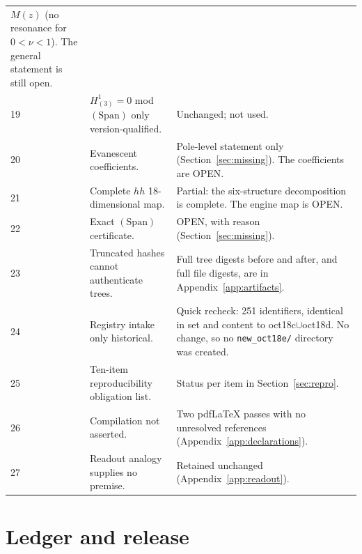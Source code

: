 \documentclass[11pt,a4paper]{article}
\newcommand{\Span}{(\mathrm{Span})}
\newcommand{\loc}[1]{\nolinkurl{#1}}
\newcommand{\OPEN}{\textsf{OPEN}}
\theoremstyle{plain}
\theoremstyle{definition}
\theoremstyle{remark}
\numberwithin{equation}{section}
\begin{document}
\begin{longtable}{@{}L{.035\linewidth}L{.36\linewidth}L{.54\linewidth}@{}}
\(M(z)\) (no resonance for \(0<\nu<1\)).
The general statement is still open.\\
19 & \(H^1_{(3)}=0\) mod \(\Span\) only version-qualified. &
Unchanged; not used.\\
20 & Evanescent coefficients. &
Pole-level statement only (Section~\ref{sec:missing}).
The coefficients are \OPEN.\\
21 & Complete \(hh\) 18-dimensional map. &
Partial: the six-structure decomposition is complete.
The engine map is \OPEN.\\
22 & Exact \(\Span\) certificate. &
\OPEN, with reason (Section~\ref{sec:missing}).\\
23 & Truncated hashes cannot authenticate trees. &
Full tree digests before and after, and full file digests,
are in Appendix~\ref{app:artifacts}.\\
24 & Registry intake only historical. &
Quick recheck: 251 identifiers, identical in set and content to
oct18c\(\cup\)oct18d.
No change, so no \loc{new_oct18e/} directory was created.\\
25 & Ten-item reproducibility obligation list. &
Status per item in Section~\ref{sec:repro}.\\
26 & Compilation not asserted. &
Two pdfLaTeX passes with no unresolved references
(Appendix~\ref{app:declarations}).\\
27 & Readout analogy supplies no premise. &
Retained unchanged (Appendix~\ref{app:readout}).\\
\end{longtable}
\endgroup

\section{Ledger and release}
\label{sec:ledger}
\end{document}
